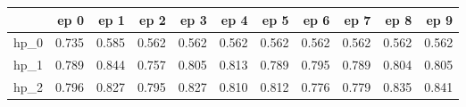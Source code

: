 \begin{tabular}{lrrrrrrrrrr}
\toprule
{} &   ep 0 &   ep 1 &   ep 2 &   ep 3 &   ep 4 &   ep 5 &   ep 6 &   ep 7 &   ep 8 &   ep 9 \\
\midrule
hp\_0 &  0.735 &  0.585 &  0.562 &  0.562 &  0.562 &  0.562 &  0.562 &  0.562 &  0.562 &  0.562 \\
hp\_1 &  0.789 &  0.844 &  0.757 &  0.805 &  0.813 &  0.789 &  0.795 &  0.789 &  0.804 &  0.805 \\
hp\_2 &  0.796 &  0.827 &  0.795 &  0.827 &  0.810 &  0.812 &  0.776 &  0.779 &  0.835 &  0.841 \\
\bottomrule
\end{tabular}
